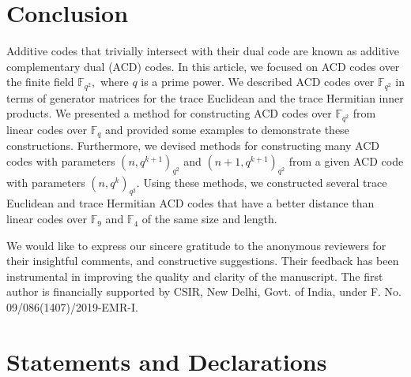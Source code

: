\documentclass[sn-mathphys-num]{sn-jnl}%
\theoremstyle{thmstyleone}%
\theoremstyle{thmstyletwo}%
\theoremstyle{thmstylethree}%
\begin{document}
\noindent









 






\section{Conclusion}\label{conclusion}
Additive codes that trivially intersect with their dual code are known as additive complementary dual (ACD) codes.  In this article, we focused on ACD codes over the finite field $\mathbb{F}_{q^2},$ where $q$ is a prime power. We described ACD codes over $\mathbb{F}_{q^2}$ in terms of generator matrices for the trace Euclidean and the trace Hermitian inner products. We presented a method for constructing ACD codes over $\mathbb{F}_{q^2}$ from linear codes over $\mathbb{F}_q$ and provided some examples to demonstrate these constructions. Furthermore, we devised methods for constructing many ACD codes with parameters $(n,q^{k+1})_{q^2}$ and $(n+1,q^{k+1})_{q^2}$ from a given ACD code with parameters $(n,q^k)_{q^2}$. Using these methods, we constructed several trace Euclidean and  trace Hermitian ACD codes that have a better distance than linear codes over 
$\mathbb{F}_9$ and $\mathbb{F}_4$ of the same size and length.






We would like to express our sincere gratitude to the anonymous reviewers for their insightful comments, and constructive suggestions. Their feedback has been instrumental in improving the quality and clarity of the manuscript. The first author is financially supported by CSIR, New Delhi, Govt. of India, under F. No. 09/086(1407)/2019-EMR-I.

\section*{Statements and Declarations}

\end{document}
